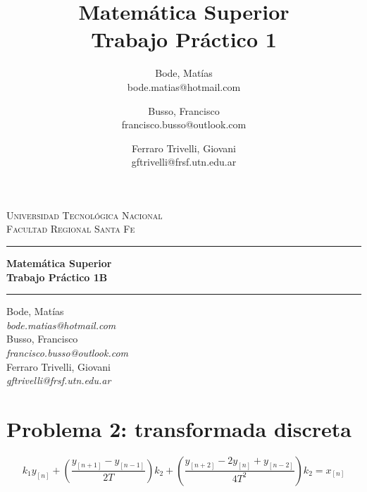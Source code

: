 \documentclass[spanish]{article}
\title{Matemática Superior\\Trabajo Práctico 1}
\author{Bode, Matías\\bode.matias@hotmail.com 
    \and Busso, Francisco\\francisco.busso@outlook.com 
    \and Ferraro Trivelli, Giovani\\gftrivelli@frsf.utn.edu.ar
}
\makeatletter
\renewcommand{\maketitle}{
    \begin{center}
        
        {\scshape{Universidad Tecnológica Nacional\\Facultad Regional Santa Fe}}
        \vspace{10pt}
        \hrule
        \vspace{10pt}
       

        {\LARGE\bfseries{Matemática Superior\\}}
        \vspace{5pt}
        {\Huge\bfseries{Trabajo Práctico 1B}}

        \vspace{8pt}
        \hrule
        \vspace{8pt}

        Bode, Matías\\
        \textit{bode.matias@hotmail.com}\\
        \vspace{7pt}
        Busso, Francisco\\
        \textit{francisco.busso@outlook.com}\\
        \vspace{7pt}
        Ferraro Trivelli, Giovani\\
        \textit{gftrivelli@frsf.utn.edu.ar}\\

        \thispagestyle{empty}
        
        \newpage
    \end{center}
}
\makeatother
\begin{document}
\maketitle
\newpage

\renewcommand{\contentsname}{Índice}
\tableofcontents
\newpage

\section[Problema 2]{Problema 2: transformada discreta}

\begin{equation}
k_1 y_{[n]} + \left(\frac{y_{[n+1]}-y_{[n-1]}}{2T}\right) k_2 + \left(\frac{y_{[n+2]}-2 y_{[n]}+y_{[n-2]}}{4T^2}\right) k_2 = x_{[n]}
\end{equation}
    
\end{document}
